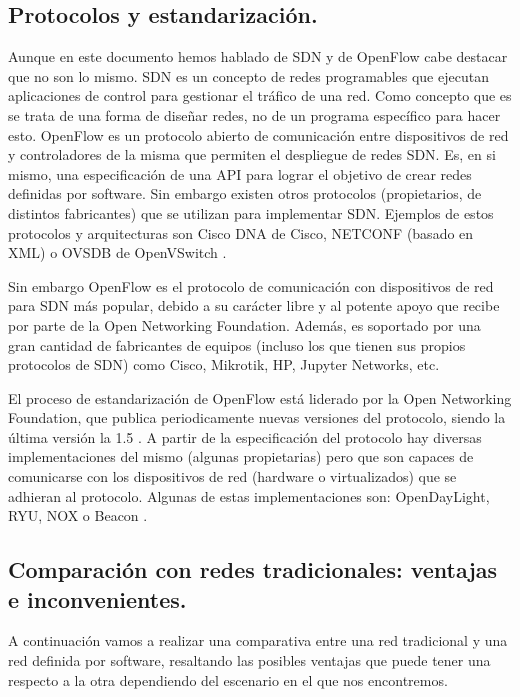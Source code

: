 \subsection{Protocolos y estandarización.}

Aunque en este documento hemos hablado de SDN y de OpenFlow cabe destacar que no son lo mismo. SDN es un concepto de redes programables que ejecutan aplicaciones de control para gestionar el tráfico de una red. Como concepto que es se trata de una forma de diseñar redes, no de un programa específico para hacer esto. OpenFlow es un protocolo abierto de comunicación entre dispositivos de red y controladores de la misma que permiten el despliegue de redes SDN. Es, en si mismo, una especificación de una API para lograr el objetivo de crear redes definidas por software. Sin embargo existen otros protocolos (propietarios, de distintos fabricantes) que se utilizan para implementar SDN. Ejemplos de estos protocolos y arquitecturas son Cisco DNA de Cisco\cite{CiscoDNA47:online}, NETCONF (basado en XML)\cite{rfc6022} o OVSDB de OpenVSwitch \cite{OpenvSwi96:online}.

Sin embargo OpenFlow es el protocolo de comunicación con dispositivos de red para SDN más popular, debido a su carácter libre y al potente apoyo que recibe por parte de la Open Networking Foundation. Además, es soportado por una gran cantidad de fabricantes de equipos (incluso los que tienen sus propios protocolos de SDN) como Cisco, Mikrotik, HP, Jupyter Networks, etc.

El proceso de estandarización de OpenFlow está liderado por la Open Networking Foundation, que publica periodicamente nuevas versiones del protocolo, siendo la última versión la 1.5 \cite{SDNTechn21:online}. A partir de la especificación del protocolo hay diversas implementaciones del mismo (algunas propietarias) pero que son capaces de comunicarse con los dispositivos de red (hardware o virtualizados) que se adhieran al protocolo. Algunas de estas implementaciones son: OpenDayLight, RYU, NOX o Beacon \cite{ListofOp48:online}.

\subsection{Comparación con redes tradicionales: ventajas e inconvenientes.}


A continuación vamos a realizar una comparativa entre una red tradicional y una red definida por software, resaltando las posibles ventajas que puede tener una respecto a la otra dependiendo del escenario en el que nos encontremos.

